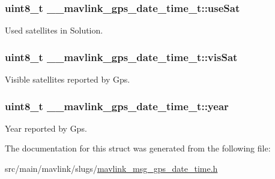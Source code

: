 \hypertarget{struct____mavlink__gps__date__time__t_ae406fbef5c776bad3d9323e41a8df2e0}{
\subsubsection[{use\+Sat}]{\setlength{\rightskip}{0pt plus 5cm}uint8\+\_\+t \+\_\+\+\_\+mavlink\+\_\+gps\+\_\+date\+\_\+time\+\_\+t\+::use\+Sat}}\label{struct____mavlink__gps__date__time__t_ae406fbef5c776bad3d9323e41a8df2e0}


Used satellites in Solution. 

\hypertarget{struct____mavlink__gps__date__time__t_a8aaa4975d66250302aefdf40b7e657c7}{
\subsubsection[{vis\+Sat}]{\setlength{\rightskip}{0pt plus 5cm}uint8\+\_\+t \+\_\+\+\_\+mavlink\+\_\+gps\+\_\+date\+\_\+time\+\_\+t\+::vis\+Sat}}\label{struct____mavlink__gps__date__time__t_a8aaa4975d66250302aefdf40b7e657c7}


Visible satellites reported by Gps. 

\hypertarget{struct____mavlink__gps__date__time__t_a4c31911d1e228a27edc844a6b3de9649}{
\subsubsection[{year}]{\setlength{\rightskip}{0pt plus 5cm}uint8\+\_\+t \+\_\+\+\_\+mavlink\+\_\+gps\+\_\+date\+\_\+time\+\_\+t\+::year}}\label{struct____mavlink__gps__date__time__t_a4c31911d1e228a27edc844a6b3de9649}


Year reported by Gps. 



The documentation for this struct was generated from the following file\+:\begin{DoxyCompactItemize}
\item 
src/main/mavlink/slugs/\hyperlink{mavlink__msg__gps__date__time_8h}{mavlink\+\_\+msg\+\_\+gps\+\_\+date\+\_\+time.\+h}\end{DoxyCompactItemize}
